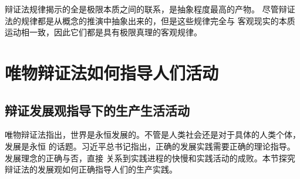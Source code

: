 \documentclass{article}
\begin{document}
    辩证法规律揭示的全是极限本质之间的联系，是抽象程度最高的产物。
    尽管辩证法的规律都是从概念的推演中抽象出来的，但是这些规律完全与
    客观现实的本质运动相一致，因此它们都是具有极限真理的客观规律。  
\section{唯物辩证法如何指导人们活动}
    \subsection{辩证发展观指导下的生产生活活动}

    唯物辩证法指出，世界是永恒发展的。不管是人类社会还是对于具体的人类个体，发展是永恒
    的话题。习近平总书记指出，正确的发展实践需要正确的理论指导。发展理念的正确与否，直接
    关系到实践进程的快慢和实践活动的成败。本节探究辩证法的发展观如何正确指导人们的生产实践。\par
\end{document}
